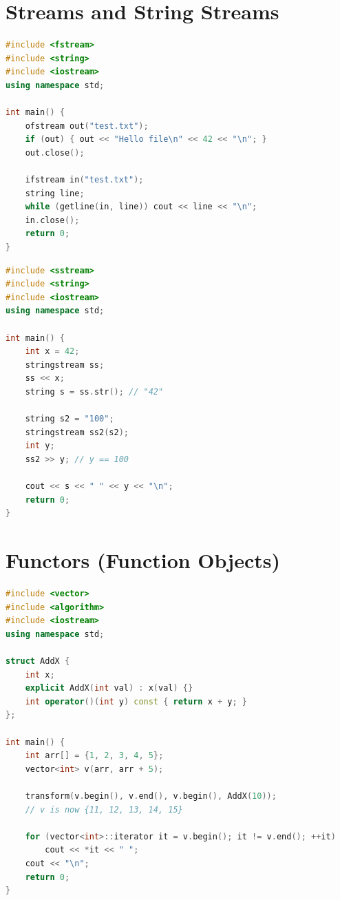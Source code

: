\section{Streams and String Streams}
\label{sec:streams}

\begin{lstlisting}[language=C++, caption={Basic file I/O}]
#include <fstream>
#include <string>
#include <iostream>
using namespace std;

int main() {
    ofstream out("test.txt");
    if (out) { out << "Hello file\n" << 42 << "\n"; }
    out.close();

    ifstream in("test.txt");
    string line;
    while (getline(in, line)) cout << line << "\n";
    in.close();
    return 0;
}
\end{lstlisting}

\begin{lstlisting}[language=C++, caption={stringstream for type conversion (C++98/03 idiom)}]
#include <sstream>
#include <string>
#include <iostream>
using namespace std;

int main() {
    int x = 42;
    stringstream ss;
    ss << x;
    string s = ss.str(); // "42"

    string s2 = "100";
    stringstream ss2(s2);
    int y;
    ss2 >> y; // y == 100

    cout << s << " " << y << "\n";
    return 0;
}
\end{lstlisting}

\section{Functors (Function Objects)}
\label{sec:functors}

\begin{lstlisting}[language=C++, caption={Custom functor with state}]
#include <vector>
#include <algorithm>
#include <iostream>
using namespace std;

struct AddX {
    int x;
    explicit AddX(int val) : x(val) {}
    int operator()(int y) const { return x + y; }
};

int main() {
    int arr[] = {1, 2, 3, 4, 5};
    vector<int> v(arr, arr + 5);

    transform(v.begin(), v.end(), v.begin(), AddX(10));
    // v is now {11, 12, 13, 14, 15}

    for (vector<int>::iterator it = v.begin(); it != v.end(); ++it)
        cout << *it << " ";
    cout << "\n";
    return 0;
}
\end{lstlisting}

